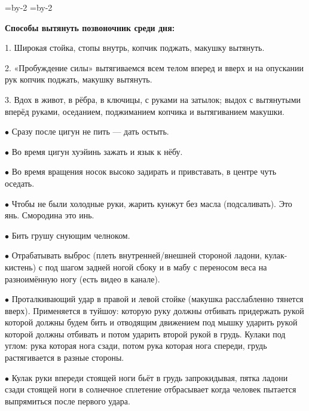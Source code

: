 \pdfhorigin=15mm \hsize=\pdfpagewidth \advance\hsize by-2\pdfhorigin
\pdfvorigin=15mm \vsize=\pdfpageheight \advance\vsize by-2\pdfvorigin

{\bf Способы вытянуть позвоночник среди дня:}

\item{1.} Широкая стойка, стопы внутрь, копчик поджать, макушку вытянуть.

\item{2.} «Пробуждение силы» вытягиваемся всем телом вперед и вверх и на опускании
рук копчик поджать, макушку вытянуть.

\item{3.} Вдох в живот, в рёбра, в ключицы, с руками на затылок;
выдох с вытянутыми вперёд руками, оседанием, поджиманием копчика и
вытягиванием макушки.

\bigskip

\item{$\bullet$} Сразу после цигун не пить --- дать остыть.

\item{$\bullet$} Во время цигун хуэйинь зажать и язык к нёбу.

\item{$\bullet$} Во время вращения носок высоко задирать и привставать, в центре чуть оседать.

\item{$\bullet$} Чтобы не были холодные руки, жарить кунжут без масла (подсаливать).
Это янь. Смородина это инь.

\item{$\bullet$} Бить грушу снующим челноком.

\item{$\bullet$} Отрабатывать выброс (плеть внутренней/внешней стороной ладони, кулак-кистень) с под шагом задней ногой сбоку и в мабу с переносом веса на разноимённую ногу (есть видео в канале).

\item{$\bullet$} Проталкивающий удар в правой и левой стойке (макушка расслабленно тянется вверх).
Применяется в туйшоу: которую руку должны отбивать придержать рукой которой должны будем бить и отводящим движением под мышку ударить рукой которой должны отбивать и потом ударить второй рукой в грудь. Кулаки под углом: рука которая нога сзади, потом рука которая нога спереди, грудь растягивается в разные стороны.

\item{$\bullet$} Кулак руки впереди стоящей ноги бьёт в грудь запрокидывая, пятка ладони сзади стоящей ноги в солнечное сплетение отбрасывает когда человек пытается выпрямиться после первого удара.

